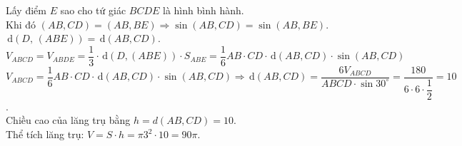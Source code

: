 \begin{ex}
{\begin{center}
		\end{center}
		Lấy điểm $E$ sao cho tứ giác $BCDE$ là hình bình hành.\\
		Khi đó $\left(AB,CD\right)=\left(AB,BE\right)\Rightarrow\sin\left(AB,CD\right)=\sin\left(AB,BE\right)$.\\
		$\mathrm{\,d}\left(D,\,\left(ABE\right)\right)=\mathrm{\,d}\left(AB,CD\right)$.\\
		$V_{ABCD}=V_{ABDE}=\dfrac{1}{3}\cdot\mathrm{\,d}\left(D,\left(ABE\right)\right)\cdot S_{ABE}=\dfrac{1}{6}AB\cdot CD\cdot\mathrm{\,d}\left(AB,CD\right)\cdot\sin\left(AB,CD\right)$\\
		$V_{ABCD}=\dfrac{1}{6}AB\cdot CD\cdot\mathrm{\,d}\left(AB,CD\right)\cdot\sin\left(AB,CD\right)\Rightarrow \mathrm{\,d}\left(AB,CD\right)=\dfrac{6V_{ABCD}}{ABCD\cdot\sin 30^\circ}=\dfrac{180}{6\cdot6\cdot\dfrac{1}{2}}=10$.\\
		Chiều cao của lăng trụ bằng $h=d\left(AB,CD\right)=10$.\\
		Thể tích lăng trụ: $V=S\cdot h=\pi{3^2}\cdot10=90\pi$.}
\end{ex}
